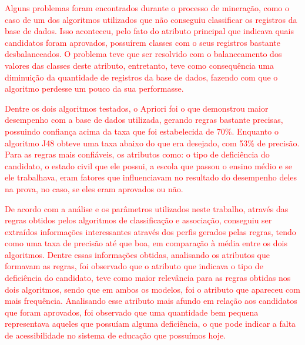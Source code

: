 \par
\textcolor{red}{Alguns problemas foram encontrados durante o processo de mineração, como o caso de um dos algoritmos utilizados que não conseguiu classificar os registros da base de dados.  Isso aconteceu, pelo fato do atributo principal que indicava quais candidatos foram aprovados, possuírem classes com o seus registros bastante desbalanceados. O problema teve que ser resolvido com o balanceamento dos valores das classes deste atributo, entretanto, teve como consequência uma diminuição da quantidade de registros da base de dados, fazendo com que o algoritmo perdesse um pouco da sua performasse.}  

\par
\textcolor{red}{Dentre os dois algoritmos testados, o Apriori foi o que demonstrou maior desempenho com a base de dados utilizada, gerando regras bastante precisas, possuindo confiança acima da taxa que foi estabelecida de 70\%. Enquanto o algoritmo J48 obteve uma taxa abaixo do que era desejado, com 53\% de precisão. Para as regras mais confiáveis, os atributos como: o tipo de deficiência do candidato, o estado civil que ele possui, a escola que passou o ensino médio e se ele trabalhava, eram fatores que influenciavam no resultado do desempenho deles na prova, no caso, se eles eram aprovados ou não.}   

\par
\textcolor{red}{De acordo com a análise e os parâmetros utilizados neste trabalho, através das regras obtidos pelos algoritmos de classificação e associação, conseguiu ser extraídos informações interessantes através dos perfis gerados pelas regras, tendo como uma taxa de precisão até que boa, em comparação à média entre os dois algoritmos. Dentre essas informações obtidas, analisando os atributos que formavam as regras, foi observado que o atributo que indicava o tipo de deficiência do candidato, teve como maior relevância para as regras obtidas nos dois algoritmos, sendo que em ambos os modelos, foi o atributo que apareceu com mais frequência. Analisando esse atributo mais afundo em relação aos candidatos que foram aprovados, foi observado que uma quantidade bem pequena representava aqueles que possuíam alguma deficiência, o que pode indicar a falta de acessibilidade no sistema de educação que possuímos hoje.}



